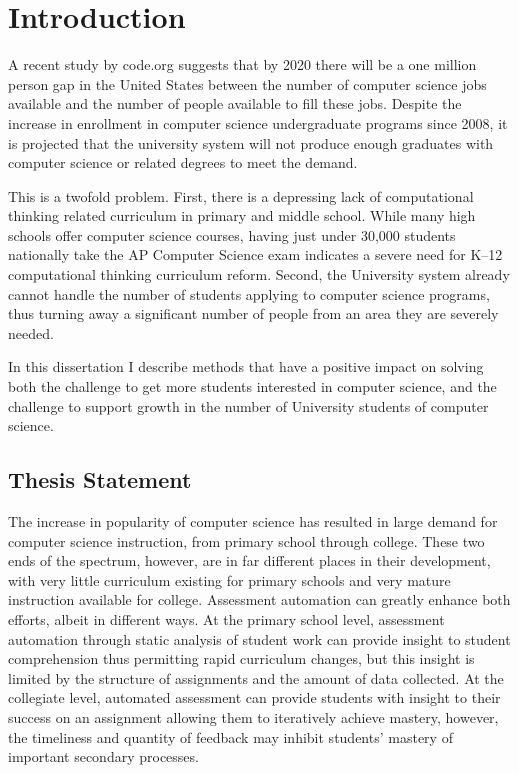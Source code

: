 \chapter{Introduction} \label{chap:introduction}
A recent study by code.org suggests that by 2020 there will be a one million
person gap in the United States between the number of computer science jobs
available and the number of people available to fill these jobs. Despite the
increase in enrollment in computer science undergraduate programs since 2008,
it is projected that the university system will not produce enough graduates
with computer science or related degrees to meet the demand.

This is a twofold problem. First, there is a depressing lack of computational
thinking related curriculum in primary and middle school. While many high
schools offer computer science courses, having just under 30,000 students
nationally take the AP Computer Science exam indicates a severe need for K--12
computational thinking curriculum reform. Second, the University system already
cannot handle the number of students applying to computer science programs,
thus turning away a significant number of people from an area they are severely
needed.

In this dissertation I describe methods that have a positive impact on solving
both the challenge to get more students interested in computer science, and the
challenge to support growth in the number of University students of computer
science.

\section{Thesis Statement}
The increase in popularity of computer science has resulted in large demand for
computer science instruction, from primary school through college. These two
ends of the spectrum, however, are in far different places in their
development, with very little curriculum existing for primary schools and very
mature instruction available for college. Assessment automation can greatly
enhance both efforts, albeit in different ways. At the primary school level,
assessment automation through static analysis of student work can provide
insight to student comprehension thus permitting rapid curriculum changes, but
this insight is limited by the structure of assignments and the amount of data
collected. At the collegiate level, automated assessment can provide students
with insight to their success on an assignment allowing them to iteratively
achieve mastery, however, the timeliness and quantity of feedback may inhibit
students' mastery of important secondary processes.

